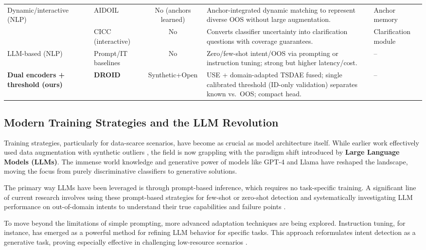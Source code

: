 \documentclass[journal,letterpaper]{IEEEtran}
\begin{document}
\begin{table}[t]
\begin{tabular}{@{}l l c p{5.3cm} p{2cm}@{}}
\midrule
Dynamic/interactive (NLP)
& AIDOIL \cite{yin2025aidoil} & No (anchors learned) & Anchor-integrated dynamic matching to represent diverse OOS without large augmentation. & Anchor memory \\
& CICC (interactive) \cite{hengst2024cicc} & No & Converts classifier uncertainty into clarification questions with coverage guarantees. & Clarification module \\
\midrule
LLM-based (NLP)
& Prompt/IT baselines \cite{marzagao-etal-2024-beyond,zhang-etal-2024-discrimination,arora-varma-2024-intent} & No & Zero/few-shot intent/OOS via prompting or instruction tuning; strong but higher latency/cost. & -- \\
\midrule
\textbf{Dual encoders + threshold (ours)}
& \textbf{DROID} & Synthetic+Open & USE + domain-adapted TSDAE fused; single calibrated threshold (ID-only validation) separates known vs.~OOS; compact head. & -- \\
\bottomrule
\end{tabular}
\end{table}



\subsection{Modern Training Strategies and the LLM Revolution}

\label{ssec:llm_revolution}

Training strategies, particularly for data-scarce scenarios, have become as crucial as model architecture itself. While earlier work effectively used data augmentation with synthetic outliers \cite{Zhan_2021}, the field is now grappling with the paradigm shift introduced by \textbf{Large Language Models (LLMs)}. The immense world knowledge and generative power of models like GPT-4 and Llama have reshaped the landscape, moving the focus from purely discriminative classifiers to generative solutions.

The primary way LLMs have been leveraged is through prompt-based inference, which requires no task-specific training. A significant line of current research involves using these prompt-based strategies for few-shot or zero-shot detection \cite{ marzagao-etal-2024-beyond, arora-varma-2024-intent} and systematically investigating LLM performance on out-of-domain intents to understand their true capabilities and failure points \cite{marzagao-etal-2024-beyond}.

To move beyond the limitations of simple prompting, more advanced adaptation techniques are being explored. Instruction tuning, for instance, has emerged as a powerful method for refining LLM behavior for specific tasks. This approach reformulates intent detection as a generative task, proving especially effective in challenging low-resource scenarios \cite{zhang-etal-2024-discrimination}.
\end{document}
